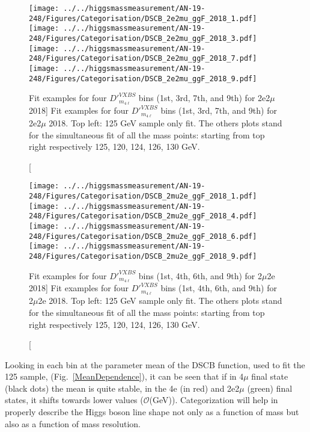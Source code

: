 \begin{figure}[!htbp]
\begin{center}
	\texttt{[image: ../../higgsmassmeasurement/AN-19-248/Figures/Categorisation/DSCB\_2e2mu\_ggF\_2018\_1.pdf]}
	\texttt{[image: ../../higgsmassmeasurement/AN-19-248/Figures/Categorisation/DSCB\_2e2mu\_ggF\_2018\_3.pdf]}
	\texttt{[image: ../../higgsmassmeasurement/AN-19-248/Figures/Categorisation/DSCB\_2e2mu\_ggF\_2018\_7.pdf]}
	\texttt{[image: ../../higgsmassmeasurement/AN-19-248/Figures/Categorisation/DSCB\_2e2mu\_ggF\_2018\_9.pdf]}
\caption
[Fit examples for four $D'^{VXBS}_{m_{4\ell}}$ bins (1st, 3rd, 7th, and 9th) 
for 2e2$\mu$ 2018]
{Fit examples for four $D'^{VXBS}_{m_{4\ell}}$ bins (1st, 3rd, 7th, and 9th) 
for 2e2$\mu$ 2018. Top left: 125 GeV sample only fit. The others plots stand for the simultaneous 
fit of all the mass points: starting from top right respectively 125, 120, 124, 126, 130 GeV.}
\label{signal_lineshape_2018_2e2mu}
\end{center}
\end{figure}

\begin{figure}[!htbp]
\begin{center}
	\texttt{[image: ../../higgsmassmeasurement/AN-19-248/Figures/Categorisation/DSCB\_2mu2e\_ggF\_2018\_1.pdf]}
	\texttt{[image: ../../higgsmassmeasurement/AN-19-248/Figures/Categorisation/DSCB\_2mu2e\_ggF\_2018\_4.pdf]}
	\texttt{[image: ../../higgsmassmeasurement/AN-19-248/Figures/Categorisation/DSCB\_2mu2e\_ggF\_2018\_6.pdf]}
	\texttt{[image: ../../higgsmassmeasurement/AN-19-248/Figures/Categorisation/DSCB\_2mu2e\_ggF\_2018\_9.pdf]}
\caption
[Fit examples for four $D'^{VXBS}_{m_{4\ell}}$ bins (1st, 4th, 6th, and 9th) 
for 2$\mu$2e 2018]
{Fit examples for four $D'^{VXBS}_{m_{4\ell}}$ bins (1st, 4th, 6th, and 9th) 
for 2$\mu$2e 2018. Top left: 125 GeV sample only fit. The others plots stand for the simultaneous 
fit of all the mass points: starting from top right respectively 125, 120, 124, 126, 130 GeV.}
\label{signal_lineshape_2018_2mu2e}
\end{center}
\end{figure}
Looking in each bin at the parameter mean of the DSCB function, used to fit the 125 \GeV sample, 
(Fig.~\ref{MeanDependence}), it can be seen that if in 4$\mu$ final state (black dots) the mean
is quite stable, in the 4e (in red) and 2e2$\mu$ (green) final states, it shifts towards lower values
($\mathcal{O}$({GeV})). Categorization will help in properly describe the Higgs boson line shape
not only as a function of mass but also as a function of mass resolution.

